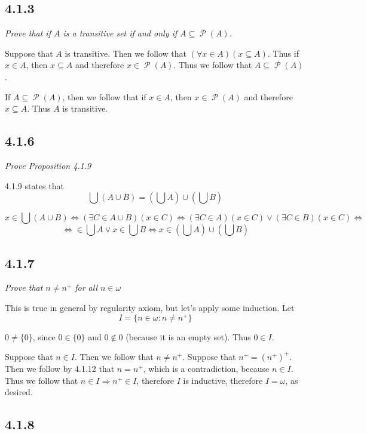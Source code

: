\documentclass[11pt,oneside,titlepage]{book}
\DeclareMathOperator \pow {\mathcal {P}}
\DeclareMathOperator \lra {\Leftrightarrow}
\DeclareMathOperator \ra {\Rightarrow}
\begin{document}
\subsection*{4.1.3}

\textit{Prove that if $A$ is a transitive set if and only if $A \subseteq \pow(A)$.}

Suppose that $A$ is transitive. Then we follow that $(\forall x \in A)(x \subseteq A)$. Thus
if $x \in A$, then $x \subseteq A$ and therefore $x \in \pow(A)$. Thus we follow that
$A \subseteq \pow(A)$.

If $A \subseteq \pow(A)$, then we follow that if $x \in A$, then $x \in \pow(A)$ and therefore
$x \subseteq A$. Thus $A$ is transitive.


\subsection*{4.1.6}

\textit{Prove Proposition 4.1.9}

4.1.9 states that
$$\bigcup(A \cup B) = (\bigcup A) \cup (\bigcup B)$$

$$x \in \bigcup(A \cup B) \lra (\exists C \in A \cup B)(x \in C) \lra
(\exists C \in A)(x \in C) \lor (\exists C \in B)(x \in C) \lra$$
$$ \lra \in \bigcup A \lor x \in \bigcup B \lra x \in (\bigcup A) \cup (\bigcup B)$$


\subsection*{4.1.7}

\textit{Prove that $n \neq n^+$ for all $n \in \omega$}

This is true in general by regularity axiom, but let's apply some induction.
Let
$$I =  \{n \in \omega: n \neq n^+\}$$

$0 \neq \{0\}$, since $0 \in  \{0\}$ and $0 \notin 0$ (because it is an empty set). Thus $0 \in I$.

Suppose that $n \in I$. Then we follow that $n \neq n^+$.
Suppose that $n^+ = (n^+)^+$. Then we follow by 4.1.12 that $n = n^+$, which is a contradiction,
because $n \in I$. Thus we follow that $n \in I \ra n^+ \in I$, therefore $I$ is inductive,
therefore $I = \omega$, as desired.


\subsection*{4.1.8}
\end{document}
